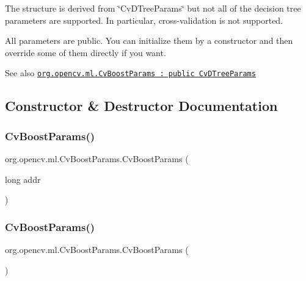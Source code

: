 {\ttfamily }

{\ttfamily The structure is derived from \char`\"{}\+Cv\+D\+Tree\+Params\char`\"{} but not all of the decision tree parameters are supported. In particular, cross-\/validation is not supported. }

All parameters are public. You can initialize them by a constructor and then override some of them directly if you want.

\begin{DoxySeeAlso}{See also}
\href{http://docs.opencv.org/modules/ml/doc/boosting.html#cvboostparams}{\tt org.\+opencv.\+ml.\+Cv\+Boost\+Params \+: public Cv\+D\+Tree\+Params} 
\end{DoxySeeAlso}


\subsection{Constructor \& Destructor Documentation}
\mbox{\label{classorg_1_1opencv_1_1ml_1_1_cv_boost_params_a69e879fc74d8c1305346387574de1f91}} 
\subsubsection{\texorpdfstring{Cv\+Boost\+Params()}{CvBoostParams()}\hspace{0.1cm}{\footnotesize\ttfamily [1/2]}}
{\footnotesize\ttfamily org.\+opencv.\+ml.\+Cv\+Boost\+Params.\+Cv\+Boost\+Params (\begin{DoxyParamCaption}\item[{long}]{addr }\end{DoxyParamCaption})\hspace{0.3cm}{\ttfamily [protected]}}

\mbox{\label{classorg_1_1opencv_1_1ml_1_1_cv_boost_params_a5b9287c0c9f817592786a0b8009eea76}} 
\subsubsection{\texorpdfstring{Cv\+Boost\+Params()}{CvBoostParams()}\hspace{0.1cm}{\footnotesize\ttfamily [2/2]}}
{\footnotesize\ttfamily org.\+opencv.\+ml.\+Cv\+Boost\+Params.\+Cv\+Boost\+Params (\begin{DoxyParamCaption}{ }\end{DoxyParamCaption})}

